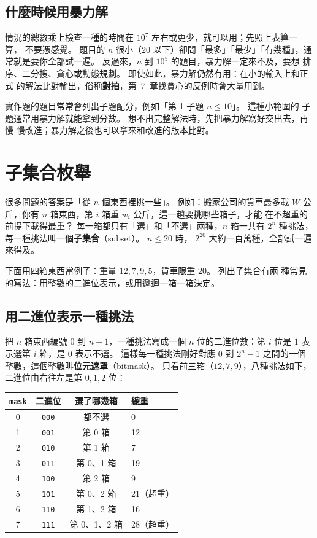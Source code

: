 \subsection{什麼時候用暴力解}

情況的總數乘上檢查一種的時間在 $10^7$ 左右或更少，就可以用；先照上表算一算，
不要憑感覺。 題目的 $n$ 很小（$20$ 以下）卻問「最多」「最少」「有幾種」，通
常就是要你全部試一遍。 反過來，$n$ 到 $10^5$ 的題目，暴力解一定來不及，要想
排序、二分搜、貪心或動態規劃。 即使如此，暴力解仍然有用：在小的輸入上和正式
的解法比對輸出，俗稱\textbf{對拍}，第~7~章找貪心的反例時會大量用到。

\begin{apcsnote}
實作題的題目常常會列出子題配分，例如「第 1 子題 $n \le 10$」。 這種小範圍的
子題通常用暴力解就能拿到分數。 想不出完整解法時，先把暴力解寫好交出去，再慢
慢改進；暴力解之後也可以拿來和改進的版本比對。
\end{apcsnote}

\section{子集合枚舉}
\label{sec:subsets}

很多問題的答案是「從 $n$ 個東西裡挑一些」。 例如：搬家公司的貨車最多載
$W$ 公斤，你有 $n$ 箱東西，第 $i$ 箱重 $w_i$ 公斤，這一趟要挑哪些箱子，才能
在不超重的前提下載得最重？ 每一箱都只有「選」和「不選」兩種，$n$ 箱一共有
$2^n$ 種挑法，每一種挑法叫一個\textbf{子集合}（subset）。 $n \le 20$ 時，
$2^{20}$ 大約一百萬種，全部試一遍來得及。

下面用四箱東西當例子：重量 $12, 7, 9, 5$，貨車限重 $20$。 列出子集合有兩
種常見的寫法：用整數的二進位表示，或用遞迴一箱一箱決定。

\subsection{用二進位表示一種挑法}

把 $n$ 箱東西編號 $0$ 到 $n - 1$，一種挑法寫成一個 $n$ 位的二進位數：第 $i$
位是 $1$ 表示選第 $i$ 箱，是 $0$ 表示不選。 這樣每一種挑法剛好對應
$0$ 到 $2^n - 1$ 之間的一個整數，這個整數叫\textbf{位元遮罩}（bitmask）。
只看前三箱（$12, 7, 9$），八種挑法如下，二進位由右往左是第 $0, 1, 2$ 位：

\begin{center}
\begin{tabular}{cccl}
\toprule
\texttt{mask} & 二進位 & 選了哪幾箱 & 總重 \\
\midrule
0 & \texttt{000} & 都不選 & 0 \\
1 & \texttt{001} & 第 0 箱 & 12 \\
2 & \texttt{010} & 第 1 箱 & 7 \\
3 & \texttt{011} & 第 0、1 箱 & 19 \\
4 & \texttt{100} & 第 2 箱 & 9 \\
5 & \texttt{101} & 第 0、2 箱 & 21（超重） \\
6 & \texttt{110} & 第 1、2 箱 & 16 \\
7 & \texttt{111} & 第 0、1、2 箱 & 28（超重） \\
\bottomrule
\end{tabular}
\end{center}

